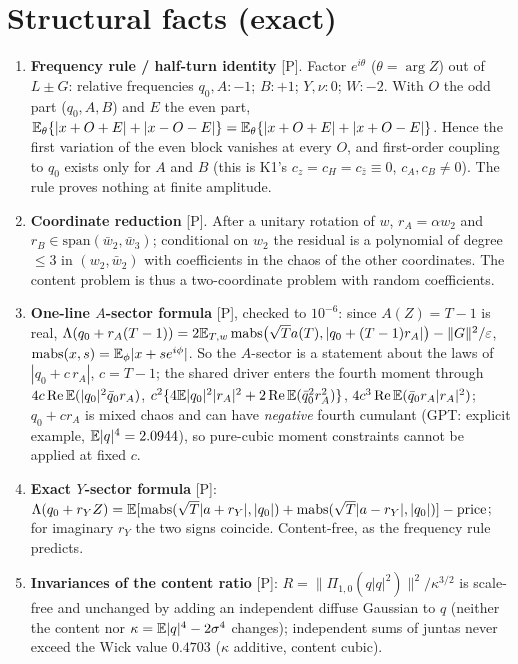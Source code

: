 \documentclass[11pt,a4paper]{article}
\renewcommand{\Re}{\operatorname{Re}}\newcommand{\Var}{\operatorname{Var}}\newcommand{\ph}{\operatorname{phase}}\newcommand{\st}[1]{\textsf{[#1]}}\newcommand{\brkus}{\textunderscore\allowbreak}\usepackage{xstring,adjustbox}\DeclareRobustCommand{\code}[1]{\begingroup\noexpandarg\StrSubstitute{#1}{/}{/\allowbreak}[\brktmp]\texttt{\let\_\brkus\hyphenchar\font=`\-\brktmp}\endgroup}\setlength{\emergencystretch}{3em}
\begin{document}
\section{Structural facts (exact)}
\begin{enumerate}
\item \textbf{Frequency rule / half-turn identity} \st{P}. Factor $e^{i\theta}$ ($\theta=\arg Z$) out of $L\pm G$: relative frequencies $q_0,A:-1$; $B:+1$; $Y,\nu:0$; $W:-2$. With $O$ the odd
part ($q_0,A,B$) and $E$ the even part, $\mathbb{E}_\theta\{|x+O+E|+|x-O-E|\}=\mathbb{E}_\theta\{|x+O+E|+|x+O-E|\}$. Hence the first variation of the even block vanishes at every $O$, and
first-order coupling to $q_0$ exists only for $A$ and $B$ (this is K1's $c_z=c_H=c_{\bar z}\equiv0$, $c_A,c_B\ne0$). The rule proves nothing at finite amplitude.
\item \textbf{Coordinate reduction} \st{P}. After a unitary rotation of $w$, $r_A=\alpha w_2$ and $r_B\in\mathrm{span}(\bar w_2,\bar w_3)$; conditional on $w_2$ the residual is a
polynomial of degree $\le3$ in $(w_2,\bar w_2)$ with coefficients in the chaos of the other coordinates. The content problem is thus a two-coordinate problem with random coefficients.
\item \textbf{One-line $A$-sector formula} \st{P}, checked to $10^{-6}$: since $A(Z)=T-1$ is real, $\Lambda(q_0+r_A(T-1))=2\mathbb{E}_{T,w}\,\mathrm{mabs}\bigl(\sqrt T a(T),|q_0+(T-1)r_A|\bigr)-\|G\|^2/\varepsilon$,
$\mathrm{mabs}(x,s)=\mathbb{E}_\phi|x+se^{i\phi}|$. So the $A$-sector is a statement about the laws of $|q_0+c\,r_A|$, $c=T-1$; the shared driver enters the fourth moment through
$4c\Re\E(|q_0|^2\bar q_0r_A)$, $c^2\{4\E|q_0|^2|r_A|^2+2\Re\E(\bar q_0^2r_A^2)\}$, $4c^3\Re\E(\bar q_0r_A|r_A|^2)$; $q_0+cr_A$ is mixed chaos and can have \emph{negative} fourth cumulant
(GPT: explicit example, $\mathbb{E}|q|^4=2.0944$), so pure-cubic moment constraints cannot be applied at fixed $c$.
\item \textbf{Exact $Y$-sector formula} \st{P}: $\Lambda(q_0+r_YZ)=\mathbb{E}[\mathrm{mabs}(\sqrt T|a+r_Y|,|q_0|)+\mathrm{mabs}(\sqrt T|a-r_Y|,|q_0|)]-\text{price}$; for imaginary $r_Y$ the two
signs coincide. Content-free, as the frequency rule predicts.
\item \textbf{Invariances of the content ratio} \st{P}: $R=\|\Pi_{1,0}(q|q|^2)\|^2/\kappa^{3/2}$ is scale-free and unchanged by adding an independent diffuse Gaussian to $q$
(neither the content nor $\kappa=\mathbb{E}|q|^4-2\sigma^4$ changes); independent sums of juntas never exceed the Wick value $0.4703$ ($\kappa$ additive, content cubic).
\end{enumerate}
\end{document}
